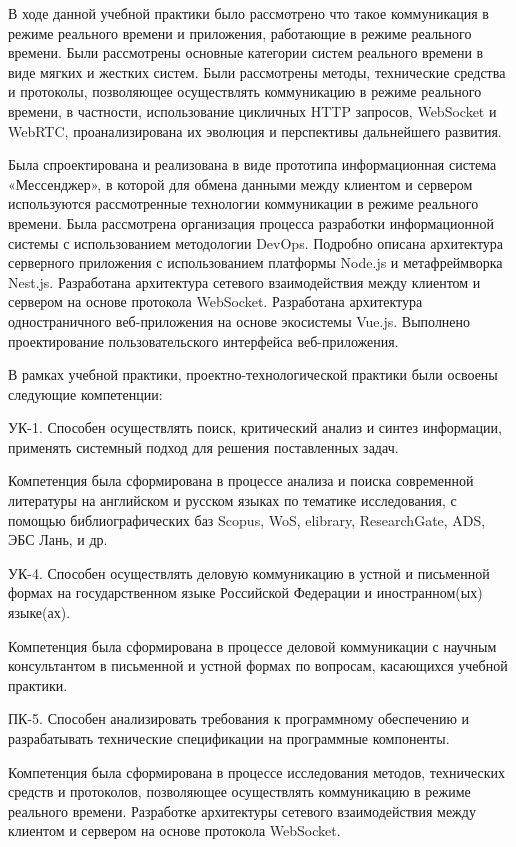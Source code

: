 \conclusion
В ходе данной учебной практики было рассмотрено что такое коммуникация в режиме реального времени и приложения, работающие в режиме реального времени.  Были рассмотрены основные категории систем реального времени в виде мягких и жестких систем. Были рассмотрены методы, технические средства и протоколы, позволяющее осуществлять коммуникацию в режиме реального времени, в частности, использование цикличных HTTP запросов, WebSocket и WebRTC, проанализирована их эволюция и перспективы дальнейшего развития.

Была спроектирована и реализована в виде прототипа информационная система «Мессенджер», в которой для обмена данными между клиентом и сервером используются рассмотренные технологии коммуникации в режиме реального времени. Была рассмотрена организация процесса разработки информационной системы с использованием методологии DevOps. Подробно описана архитектура серверного приложения с использованием платформы Node.js и метафреймворка Nest.js. Разработана архитектура сетевого взаимодействия между клиентом и сервером на основе протокола WebSocket. Разработана архитектура одностраничного веб-приложения на основе экосистемы Vue.js. Выполнено проектирование пользовательского интерфейса веб-приложения.

В рамках учебной практики, проектно-технологической практики были освоены следующие компетенции:

УК-1. Способен осуществлять поиск, критический анализ и синтез информации, применять системный подход для решения поставленных задач.

Компетенция была сформирована в процессе анализа и поиска современной литературы на английском и русском языках по тематике исследования, с помощью библиографических баз Scopus, WoS, elibrary, ResearchGate, ADS, ЭБС Лань, и др.

УК-4. Способен осуществлять деловую коммуникацию в устной и письменной формах на государственном языке Российской Федерации и иностранном(ых) языке(ах).

Компетенция была сформирована в процессе деловой коммуникации с научным консультантом в письменной и устной формах по вопросам, касающихся учебной практики.

ПК-5. Способен анализировать требования к программному обеспечению
и разрабатывать технические спецификации на программные компоненты.

Компетенция была сформирована в процессе исследования методов, технических средств и протоколов, позволяющее осуществлять коммуникацию в режиме реального времени. Разработке архитектуры сетевого взаимодействия между клиентом и сервером на основе протокола WebSocket.

